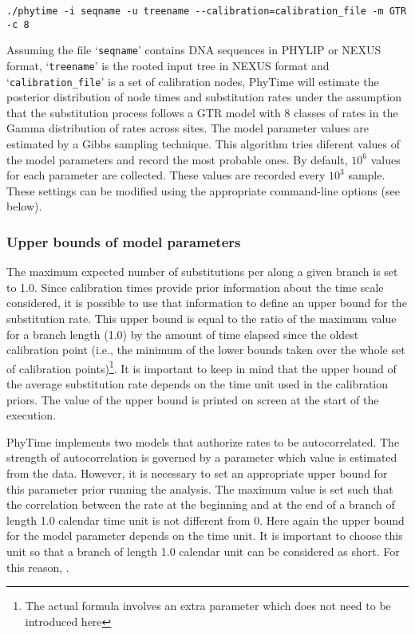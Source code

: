 \documentclass[a4paper,12pt]{article}
\newcommand{\x}[1]{\texttt{#1}}
\begin{document}
\begin{Verbatim}[fontsize=\small]
./phytime -i seqname -u treename --calibration=calibration_file -m GTR -c 8
\end{Verbatim}

Assuming the file `\x{seqname}' contains DNA  sequences in PHYLIP or NEXUS format, `\x{treename}' is
the rooted  input tree in NEXUS  format and `\x{calibration\_file}'  is a set of  calibration nodes,
PhyTime will  estimate the  posterior distribution of  node times  and substitution rates  under the
assumption that the  substitution process follows a GTR  model with 8 classes of rates  in the Gamma
distribution of  rates across sites. The  model parameter values  are estimated by a  Gibbs sampling
technique. This algorithm tries diferent values of the model parameters and record the most probable
ones. By default,  $10^6$ values for each  parameter are collected. These values  are recorded every
$10^3$  sample. These  settings can  be  modified using  the appropriate  command-line options  (see
below).


\subsubsection{Upper bounds of model parameters}

The  maximum expected  number  of substitutions  per  along a  given  branch is  set  to 1.0.  Since
calibration times provide prior  information about the time scale considered, it  is possible to use
that information to  define an upper bound for  the substitution rate. This upper bound  is equal to
the ratio of  the maximum value for  a branch length (1.0) by  the amount of time  elapsed since the
oldest  calibration point  (i.e., the  minimum  of the  lower bounds  taken  over the  whole set  of
calibration points)\footnote{The actual  formula involves an extra parameter which  does not need to
be  introduced  here}. It  is  important  to keep  in  mind  that the  upper  bound  of the  average
substitution rate depends  on the time unit used  in the calibration priors. The value  of the upper
bound is printed on screen at the start of the execution.

PhyTime  implements  two  models  that  authorize  rates  to  be  autocorrelated.  The  strength  of
autocorrelation is governed  by a parameter which value  is estimated from the data.  However, it is
necessary to  set an appropriate  upper bound  for this parameter  prior running the  analysis.  The
maximum value is set such that the correlation between the rate at the beginning and at the end of a
branch of length 1.0 calendar time unit is not  different from 0. Here again the upper bound for the
model parameter depends  on the time unit. It is  important to choose this unit so  that a branch of
length 1.0 calendar unit can be considered as short. For this reason, {\color{red}{we recommend to select a time
unit so that the calibration times take values between -10 and -1000}}.
\end{document}
